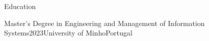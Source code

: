 \documentclass[a4paper]{resume} %
\begin{document}
\begin{rSection}{Education}

    \begin{rSubsection}{Master's Degree in Engineering and Management of Information Systems}{2023}{University of Minho}{Portugal}
    \end{rSubsection}
    
\end{rSection}


%
%    
%
\end{document}
